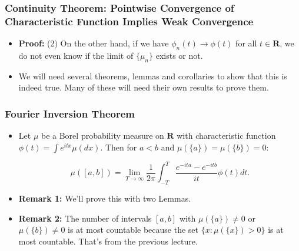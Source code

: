\documentclass[handout]{beamer}
\begin{document}
\frame
{
  \frametitle{Continuity Theorem: Pointwise Convergence of Characteristic Function Implies Weak Convergence} 

 \begin{itemize}
 
 \item<1-> \textbf{Proof:} (2) On the other hand, if we have $\phi_n(t)\rightarrow \phi(t)$ for all $t \in \mathbf{R}$, we do not even know if the limit of $\{\mu_n\}$ exists or not. 
 
 \item<2-> We will need several theorems, lemmas and corollaries to show that this is indeed true. Many of these will need their own results to prove them.
 
% 
% 
% 
% 
 
 
\end{itemize}
}


\frame
{
  \frametitle{Fourier Inversion Theorem} 

 \begin{itemize}
 
  \item<1->[] \begin{Theorem} Let $\mu$ be a Borel probability measure on $\mathbf{R}$ with characteristic function $\phi(t)=\int e^{itx} \mu(dx)$. Then for $a<b$ and $\mu(\{a\})=\mu(\{b\})=0$:
  
  $$\mu([a,b])=\lim_{T\rightarrow \infty} \frac{1}{2\pi} \int_{-T}^T \frac{e^{-ita}-e^{-itb}}{it} \phi(t) dt.$$
  
   \end{Theorem}
  
 
 \item<2-> \textbf{Remark 1:} We'll prove this with two Lemmas.
 
 \item<3-> \textbf{Remark 2:} The number of intervals $[a,b]$ with $\mu(\{a\}) \neq 0 $ or $\mu(\{b\})\neq 0$ is at most countable because the set $\{x:\mu(\{x\})>0\}$ is at most countable. That's from the previous lecture.  
 
\end{itemize}
}
\end{document}
